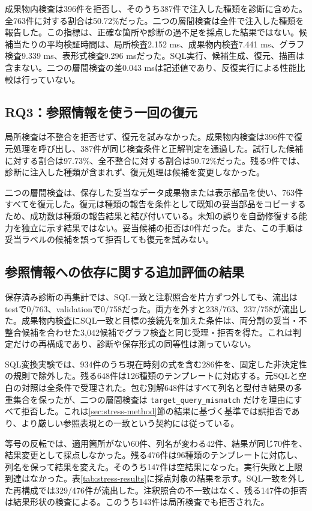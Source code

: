 \documentclass[manuscript,review,anonymous]{acmart}
\begin{document}
成果物内検査は396件を拒否し、そのうち387件で注入した種類を診断に含めた。全763件に対する割合は50.72\%だった。二つの層間検査は全件で注入した種類を報告した。この指標は、正確な箇所や診断の過不足を採点した結果ではない。候補当たりの平均検証時間は、局所検査2.152 ms、成果物内検査7.441 ms、グラフ検査9.339 ms、表形式検査9.296 msだった。SQL実行、候補生成、復元、描画は含まない。二つの層間検査の差0.043 msは記述値であり、反復実行による性能比較は行っていない。

\subsection{RQ3：参照情報を使う一回の復元}

局所検査は不整合を拒否せず、復元を試みなかった。成果物内検査は396件で復元処理を呼び出し、387件が同じ検査条件と正解判定を通過した。試行した候補に対する割合は97.73\%、全不整合に対する割合は50.72\%だった。残る9件では、診断に注入した種類が含まれず、復元処理は候補を変更しなかった。

二つの層間検査は、保存した妥当なデータ成果物または表示部品を使い、763件すべてを復元した。復元は種類の報告を条件として既知の妥当部品をコピーするため、成功数は種類の報告結果と結び付いている。未知の誤りを自動修復する能力を独立に示す結果ではない。妥当候補の拒否は0件だった。また、この手順は妥当ラベルの候補を誤って拒否しても復元を試みない。

\subsection{参照情報への依存に関する追加評価の結果}
\label{sec:stress-results}

保存済み診断の再集計では、SQL一致と注釈照合を片方ずつ外しても、流出はtestで0/763、validationで0/758だった。両方を外すと238/763、237/758が流出した。成果物内検査にSQL一致と目標の接続先を加えた条件は、両分割の妥当・不整合候補を合わせた3,042候補でグラフ検査と同じ受理・拒否を得た。これは判定だけの再構成であり、診断や保存形式の同等性は測っていない。

SQL変換実験では、934件のうち現在時刻の式を含む286件を、固定した非決定性の規則で除外した。残る648件は126種類のテンプレートに対応する。元SQLと空白の対照は全条件で受理された。包む別解648件はすべて列名と型付き結果の多重集合を保ったが、二つの層間検査は \texttt{target\_query\_mismatch} だけを理由にすべて拒否した。これは\ref{sec:stress-method}節の結果に基づく基準では誤拒否であり、より厳しい参照表現との一致という契約には従っている。

等号の反転では、適用箇所がない60件、列名が変わる42件、結果が同じ70件を、結果変更として採点しなかった。残る476件は96種類のテンプレートに対応し、列名を保って結果を変えた。そのうち147件は空結果になった。実行失敗と上限到達はなかった。表\ref{tab:stress-results}に採点対象の結果を示す。SQL一致を外した再構成では329/476件が流出した。注釈照合の不一致はなく、残る147件の拒否は結果形状の検査による。このうち143件は局所検査でも拒否された。
\end{document}
